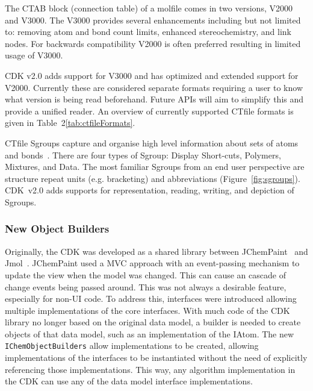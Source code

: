 \documentclass[10pt]{bmcart}
\def \cdkversion {v2.0}
\begin{document}
The CTAB block (connection table) of a molfile comes in two versions, V2000
and V3000. The V3000 provides several enhancements including but not
limited to: removing atom and bond count limits, enhanced stereochemistry,
and link nodes. For backwards compatibility V2000 is often preferred resulting
in limited usage of V3000.

CDK \cdkversion{} adds support for V3000 and has optimized and extended
support for V2000. Currently these are considered separate formats requiring
a user to know what version is being read beforehand. Future APIs will aim
to simplify this and provide a unified reader. An overview of currently
supported CTfile formats is given in Table~2\ref{tab:ctfileFormats}.

CTfile Sgroups capture and organise high level information about sets of atoms
and bonds~\cite{Gushurst91}. There are four types of Sgroup: Display Short-cuts, Polymers,
Mixtures, and Data. The most familiar Sgroups from an end user perspective are structure 
repeat units (e.g. bracketing) and abbreviations (Figure~\ref{fig:sgroups}).
CDK~\cdkversion{} adds supports for representation, reading, writing, and depiction of Sgroups.


\subsubsection*{New Object Builders}

Originally, the CDK was developed as a shared library between
JChemPaint~\cite{krause2000jchempaint} and
Jmol~\cite{Willighagen2007jmol,Hanson2010}.  JChemPaint used a MVC
approach with an event-passing mechanism to update the view when the
model was changed. This can cause an cascade of change events being
passed around. This was not always a desirable feature, especially for
non-UI code. To address this, interfaces were introduced allowing
multiple implementations of the core interfaces. With much code of the CDK
library no longer based on the original data model, a builder is needed to
create objects of that data model, such as an implementation of the IAtom.
The new \texttt{IChemObjectBuilders} allow implementations to be created, allowing
implementations of the interfaces to be instantiated without the need
of explicitly referencing those implementations. This way, any algorithm
implementation in the CDK can use any of the data model interface
implementations.
\end{document}
